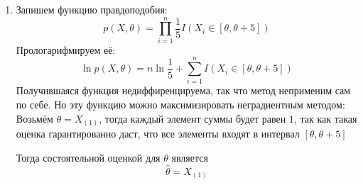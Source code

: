 \documentclass{article}
\begin{document}
\begin{enumerate}
	\item Запишем функцию правдоподобия:
	      \[
		      p(X, \theta) = \prod_{i=1}^n \frac{1}{5} I(X_i \in [\theta, \theta + 5])
	      \]
	      Прологарифмируем её:
	      \[
		      \ln p(X, \theta) = n \ln \frac{1}{5} + \sum_{i=1}^n I(X_i \in [\theta, \theta + 5])
	      \]
	      Получившаяся функция недиффиренцируема,
	      так что метод неприменим сам по себе. Но эту функцию
	      можно максимизировать неградиентным методом: Возьмём
	      $\theta = X_{(1)}$, тогда каждый элемент суммы будет
	      равен $1$, так как такая оценка гарантированно даст,
	      что все элементы входят в интервал $[\theta, \theta + 5]$

	      Тогда состоятельной оценкой для $\theta$ является
	      \[
		      \widehat{\theta} = X_{(1)}
	      \]

\end{enumerate}
\end{document}
